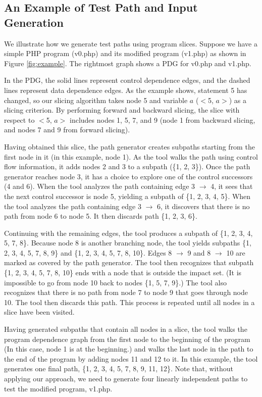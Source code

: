 
\subsection{An Example of Test Path and Input Generation}



We illustrate how we generate test paths using program slices.
Suppose we have a simple PHP program (v0.php) and its 
modified program (v1.php) as shown in Figure \ref{fig:example}.
The rightmost graph shows a PDG for v0.php and v1.php.

In the PDG, the solid lines represent control dependence edges, 
and the dashed lines represent data dependence edges. 
As the example shows, statement 5 has changed, so our slicing
algorithm takes node 5 and variable $a$ ($<$5, $a>$) as a slicing 
criterion. By performing forward and backward slicing, the slice 
with respect to $<$5, $a>$ includes nodes 1, 5, 7, and 9 (node 1 
from backward slicing, and nodes 7 and 9 from forward slicing). 

Having obtained this slice, the path generator creates subpaths 
starting from the first node in it (in this example, node 1). 
As the tool walks the path using control flow information, 
it adds nodes 2 and 3 to a subpath (\{1, 2, 3\}). 
Once the path generator reaches node 3, it has a choice to 
explore one of the control successors (4 and 6).
When the tool analyzes the path containing edge 
3 $\rightarrow$ 4, it sees that the next 
control successor is node 5, yielding a subpath of 
\{1, 2, 3, 4, 5\}. 
When the tool analyzes the path containing edge 
3 $\rightarrow$ 6, it discovers that
there is no path from node 6 to node 5. It then discards
path \{1, 2, 3, 6\}. 
 
Continuing with the remaining edges, the tool produces
a subpath of \{1, 2, 3, 4, 5, 7, 8\}. Because node 8 
is another branching node, the tool yields subpaths 
\{1, 2, 3, 4, 5, 7, 8, 9\} and \{1, 2, 3, 4, 5, 7, 8, 10\}. 
Edges 8 $\rightarrow$ 9 and 8 $\rightarrow$ 10 are marked as 
covered by the path generator. The tool then recognizes that 
subpath \{1, 2, 3, 4, 5, 7, 8, 10\} ends with a node that is 
outside the impact set. (It is impossible to go from node 10 
back to nodes \{1, 5, 7, 9\}.) The tool also recognizes that 
there is no path from node 7 to node 9 that goes through node 10. 
The tool then discards this path. This process is repeated until 
all nodes in a slice have been visited.

Having generated subpaths that contain all nodes in a slice,
the tool walks the program dependence graph from the 
first node to the beginning of the program (In this case, node 1 
is at the beginning.) and walks the last node in the path to the 
end of the program by adding nodes 11 and 12 to it.
In this example, the tool generates one final path,
\{1, 2, 3, 4, 5, 7, 8, 9, 11, 12\}.
Note that, without applying our approach, we need to generate
four linearly independent paths to test the modified program,
v1.php. 

